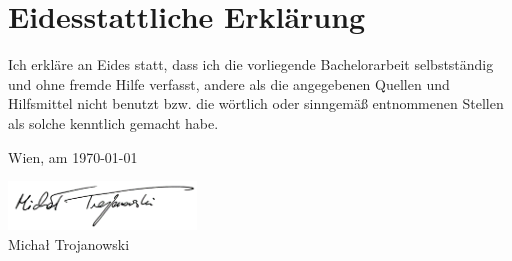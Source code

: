 \documentclass[a4paper,11pt,bibliography=totoc,listof=totoc,headinclude=true,cleardoublepage=empty,oneside]{scrbook}
\begin{document}
\cleardoublepage


\chapter*{Eidesstattliche Erkl\"arung}
\thispagestyle{empty}
\thispagestyle{empty}

\vspace*{2cm}

Ich erkl\"are an Eides statt, dass ich die vorliegende Bachelorarbeit selbstst\"andig und ohne fremde Hilfe verfasst, andere als die angegebenen Quellen und Hilfsmittel nicht benutzt bzw. die w\"ortlich oder sinngem\"a{\ss} entnommenen Stellen als solche kenntlich gemacht habe.

\vspace*{3cm}

\noindent
Wien, am \today
%
\hfill 
%
\begin{minipage}[t]{5cm}
\centering
\underline{\includegraphics[width=5cm]{latex//images//MT.png}}\\
\small{Michał Trojanowski}
\end{minipage}

\cleardoublepage



\tableofcontents

\cleardoublepage
{} 

\end{document}
